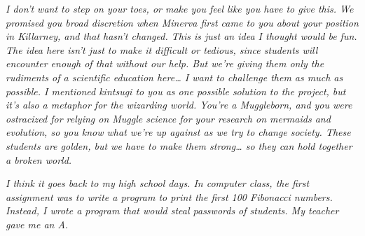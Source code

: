 \emph{I don't want to step on your toes, or make you feel like you have
to give this. We promised you broad discretion when Minerva first came
to you about your position in Killarney, and that hasn't changed. This
is just an idea I thought would be fun. The idea here isn't just to make
it difficult or tedious, since students will encounter enough of that
without our help. But we're giving them only the rudiments of a
scientific education here\ldots{} I want to challenge them as much as
possible. I mentioned kintsugi to you as one possible solution to the
project, but it's also a metaphor for the wizarding world. You're a
Muggleborn, and you were ostracized for relying on Muggle science for
your research on mermaids and evolution, so you know what we're up
against as we try to change society. These students are golden, but we
have to make them strong\ldots{} so they can hold together a broken
world.}


\mybreak

\emph{I think it goes back to my high school days. In computer class,
the first assignment was to write a program to print the first 100
Fibonacci numbers. Instead, I wrote a program that would steal passwords
of students. My teacher gave me an A.}


\Stopbonus
